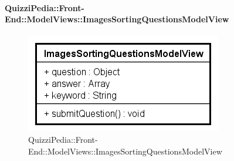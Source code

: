 \paragraph{QuizziPedia::Front-End::ModelViews::ImagesSortingQuestionsModelView}
\begin{figure} [ht]
	\centering
	\includegraphics[scale=0.80]{UML/Classi/Front-End/QuizziPedia_Front-end_ModelView_ImagesSortingQuestionsModelView.png}
	\caption{QuizziPedia::Front-End::ModelViews::ImagesSortingQuestionsModelView}
\end{figure} \FloatBarrier

